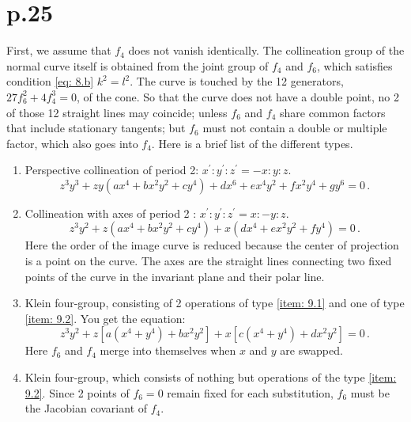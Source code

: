 \documentclass[leqno]{article}
\begin{document}
\section{p.25}
First, we assume that $f_4$ does not vanish identically. The collineation group of the normal curve itself is obtained from the joint group of $f_4$ and $f_6$, which satisfies condition \eqref{eq: 8.b} $k^2=l^2$. The curve is touched by the 12 generators, $27 f_6^2 + 4 f_4^3=0$, of the cone. So that the curve does not have a double point, no 2 of those 12 straight lines may coincide; unless $f_6$ and $f_4$ share common factors that include stationary tangents; but $f_6$ must not contain a double or multiple factor, which also goes into $f_4$. Here is a brief list of the different types. 
\begin{enumerate}[label=\arabic*)]
    \item \label{item: 9.1}Perspective collineation of period 2: $x^\prime : y^\prime : z^\prime = -x : y : z$.
    \begin{equation}\label{eq: 9.1}
        z^3 y^3 + zy (ax^4 + b x^2 y^2 + c y^4) + dx^6 + e x^4 y^2 + f x^2 y^4 + g y^6 = 0 \, . \tag{1}
    \end{equation}
    \item \label{item: 9.2}Collineation \guillemotright with axes\guillemotright{} of period 2 : $x^\prime : y^\prime : z^\prime = x : -y : z$.
    \begin{equation}\label{eq: 9.2}
        z^3 y^2 + z(ax^4 + b x^2 y^2 + c y^4) + x(dx^4 + e x^2 y^2 + f y^4) = 0 \, . \tag{2}
    \end{equation}
    Here the order of the image curve is reduced because the center of projection is a point on the curve. The axes are the straight lines connecting two fixed points of the curve in the invariant plane and their polar line.
    \item \label{item: 9.3}Klein four-group, consisting of 2 operations of type \ref{item: 9.1} and one of type \ref{item: 9.2}. You get the equation: 
    \begin{equation}\label{eq: 9.3}
        z^3 y^2 + z[a(x^4 + y^4) + b x^2 y^2] + x[c(x^4 + y^4) + d x^2 y^2] = 0 \, . \tag{3}
    \end{equation}
    Here $f_6$ and $f_4$ merge into themselves when $x$ and $y$ are swapped.
    \item \label{item: 9.4}Klein four-group, which consists of nothing but operations of the type \ref{item: 9.2}. Since 2 points of $f_6=0$ remain fixed for each substitution, $f_6$ must be the Jacobian covariant of $f_4$.

\end{enumerate}
\end{document}
